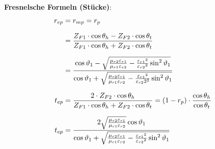 \textbf{Fresnelsche Formeln (Stücke)}:
\begin{equation*}
	\setlength{\jot}{10pt}
	\begin{aligned}
		r_{ep}    & =  r_{mp} = r_{p}                                                                                                                                                                                                     \\
		& = \frac{Z_{F1} \cdot \cos \theta_h-Z_{F2} \cdot \cos \theta_t}{Z_{F1} \cdot \cos \theta_h+Z_{F2} \cdot \cos \theta_t}
		\\
		& =\frac{\cos \vartheta_1-\sqrt{\frac{\mu_{r 2} \varepsilon_{r 1}}{\mu_{r 1} \varepsilon_{r 2}}-\frac{\varepsilon_{r 1}{ }^2}{\varepsilon_{r 2}{ }^2} \sin ^2 \vartheta_1}}{\cos \vartheta_1+\sqrt{\frac{\mu_{r 2} \varepsilon_{r 1}}{\mu_{r 1} \varepsilon_{r 2}}-\frac{\varepsilon_{r 1}{ }^2}{\varepsilon_{r 2} 2^2} \sin ^2 \vartheta_1}} \\
		t_{ep} & =  \frac{2 \cdot Z_{F2}   \cdot  \cos \theta_h}{Z_{F1} \cdot \cos \theta_h+Z_{F2} \cdot \cos \theta_t}                                                                                                                           = (1-r_p) \cdot \dfrac{\cos \theta_h}{\cos \theta_t}                                                                                                                                                                        \\
				t_{e p}&=\frac{2 \sqrt{\frac{\mu_{r 2} \varepsilon_{r 1}}{\mu_{r 1} \varepsilon_{r 2}}} \cos \vartheta_1}{\cos \vartheta_1+\sqrt{\frac{\mu_{r 2} \varepsilon_{r 1}}{\mu_{r 1} \varepsilon_{r 2}}-\frac{\varepsilon_{r 1}{ }^2}{\varepsilon_{r 2}{ }^2} \sin ^2 \vartheta_1}} \\

\end{aligned}
\end{equation*}
